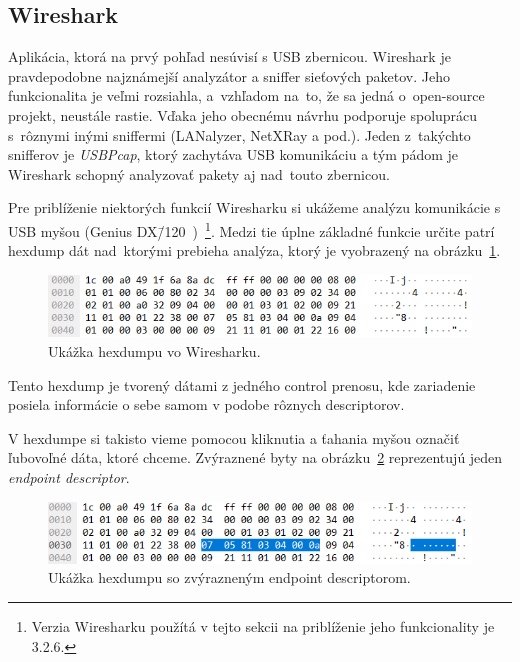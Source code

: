 \subsection*{Wireshark}
\label{uvod:sec:Wireshark}

Aplikácia, ktorá na prvý pohľad nesúvisí s USB zbernicou. Wireshark je pravdepodobne najznámejší analyzátor a sniffer sieťových paketov. Jeho funkcionalita je veľmi rozsiahla, a~vzhľadom na~to, že sa jedná o~open-source projekt, neustále rastie. Vďaka jeho obecnému návrhu podporuje spoluprácu s~rôznymi inými sniffermi (LANalyzer, NetXRay a pod.). Jeden z~takýchto snifferov je \textit{USBPcap}, ktorý zachytáva USB komunikáciu a tým pádom je Wireshark schopný analyzovať pakety aj nad~touto zbernicou. 

Pre priblíženie niektorých funkcií Wiresharku si ukážeme analýzu komunikácie s USB myšou (Genius DX\=/120~\cite{genius_mouse})~\footnote{Verzia Wiresharku použítá v tejto sekcii na priblíženie jeho funkcionality je 3.2.6.}. Medzi tie úplne základné funkcie určite patrí hexdump dát nad~ktorými prebieha analýza, ktorý je vyobrazený na obrázku~\ref{obr:uvod:wireshark_hexdump}. 

\begin{figure}[!htb]
	\centering
	\includegraphics[width=12cm]{img/uvod_wireshark_hexdump}
	\caption{Ukážka hexdumpu vo Wiresharku.}
	\label{obr:uvod:wireshark_hexdump}
\end{figure}


Tento hexdump je tvorený dátami z jedného control prenosu, kde zariadenie posiela informácie o sebe samom v podobe rôznych descriptorov. 

V hexdumpe si takisto vieme pomocou kliknutia a ťahania myšou označiť ľubovoľné dáta, ktoré chceme. Zvýraznené byty na obrázku~\ref{obr:uvod:wireshark_hexdump_endpoint} reprezentujú jeden \textit{endpoint descriptor}.

\begin{figure}[!htb]
	\centering
	\includegraphics[width=12cm]{img/uvod_wireshark_hexdump_endpoint}
	\caption{Ukážka hexdumpu so zvýrazneným endpoint descriptorom.}
	\label{obr:uvod:wireshark_hexdump_endpoint}
\end{figure}


